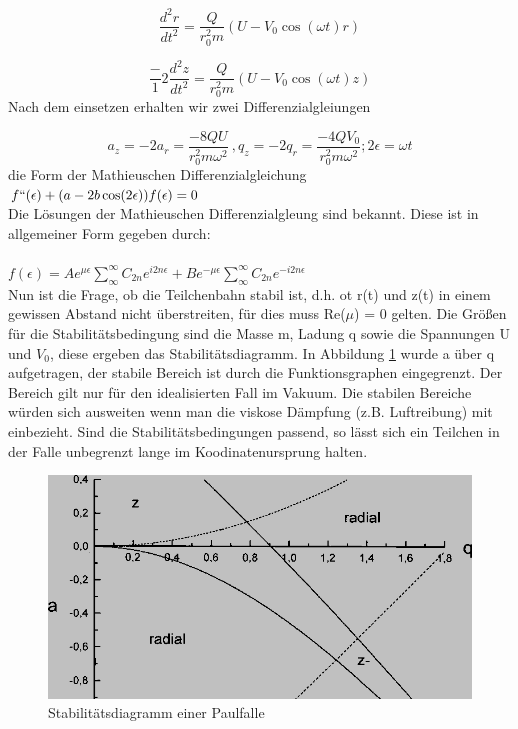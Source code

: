 \documentclass[10pt,a4paper]{article}
\begin{document}
\begin{equation}
\frac {d^2r}{dt^2} = \frac{Q}{r_0^2 m}(U-V_0 \cos(\omega t)r)
\label {3}
\end{equation}


\begin{equation}
\frac -{1}{2}\frac {d^2z}{dt^2} = \frac{Q}{r_0^2 m}(U-V_0 \cos(\omega t)z)
\label {4}
\end{equation}
Nach dem einsetzen erhalten wir zwei Differenzialgleiungen 


\begin{equation}
a_z = -2a_r =\frac{-8 Q U}{r_0^2 m \omega^2}\
,q_z = -2q_r =\frac{-4 Q V_0}{r_0^2 m \omega^2}; 2\epsilon = \omega t
\label {5}
\end{equation}
die Form der Mathieuschen Differenzialgleichung \\

$ f``(\epsilon) + (a-2b \cos(2\epsilon))f(\epsilon) = 0$\\
Die Lösungen der Mathieuschen  Differenzialgleung sind bekannt. Diese ist in allgemeiner Form gegeben durch: \\\\

$ f(\epsilon) = A e^{\mu \epsilon} \sum_{\infty}^\infty C_{2n} e^{i2n\epsilon}+B e^{-\mu \epsilon} \sum_{\infty}^\infty C_{2n} e^{-i2n\epsilon}$\\Nun ist die Frage, ob die Teilchenbahn stabil ist, d.h. ot r(t) und z(t) in einem gewissen Abstand nicht überstreiten, für dies muss Re($\mu$) = 0 gelten. 
Die Größen für die Stabilitätsbedingung sind die Masse m, Ladung q sowie die Spannungen U und $V_0$, diese ergeben das Stabilitätsdiagramm. In Abbildung \ref{stab} wurde a über q aufgetragen, der stabile Bereich ist durch die Funktionsgraphen eingegrenzt. Der Bereich gilt nur für den idealisierten Fall im Vakuum. Die stabilen Bereiche würden sich ausweiten wenn man die viskose Dämpfung (z.B. Luftreibung)  mit einbezieht. Sind die Stabilitätsbedingungen passend, so lässt sich ein Teilchen in der Falle unbegrenzt lange im Koodinatenursprung halten.


\begin{figure}[h]
	\includegraphics[scale = 0.5]{Paulstabdia.png}
	\centering
	\caption{Stabilitätsdiagramm einer Paulfalle}
	\label{stab}
\end{figure}
\end{document}
